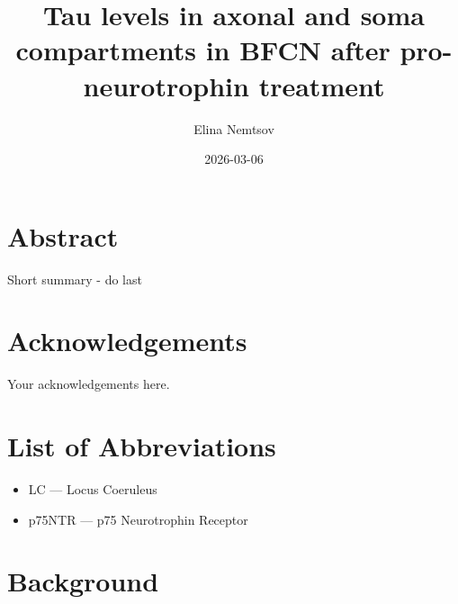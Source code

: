 \documentclass[
  letterpaper,
  DIV=11,
  numbers=noendperiod]{scrreprt}
\title{Tau levels in axonal and soma compartments in BFCN after
pro-neurotrophin treatment}
\author{Elina Nemtsov}
\date{2026-03-06}
\providecommand{\tightlist}{%
  \setlength{\itemsep}{0pt}\setlength{\parskip}{0pt}}
\renewcommand*\contentsname{Table of contents}
\newcommand\contentsname{Table of contents}
\begin{document}
\maketitle

\renewcommand*\contentsname{Table of contents}
{
\hypersetup{linkcolor=}
\setcounter{tocdepth}{2}
\tableofcontents
}


\chapter{}\label{section}


\chapter*{Abstract}\label{abstract}


Short summary - do last


\chapter*{Acknowledgements}\label{acknowledgements}


Your acknowledgements here.


\chapter*{List of Abbreviations}\label{list-of-abbreviations}


\begin{itemize}
\tightlist
\item
  LC --- Locus Coeruleus
\item
  p75NTR --- p75 Neurotrophin Receptor
\end{itemize}


\chapter{Background}\label{background}
\end{document}
